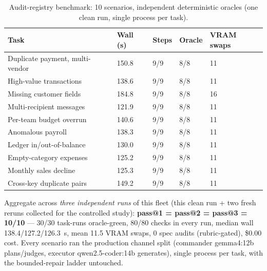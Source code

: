 \documentclass[11pt]{article}
\begin{document}
\begin{table}[h!t]\centering\small
\caption{Audit-registry benchmark: 10 scenarios, independent deterministic oracles
(one clean run, single process per task).
\label{tab:registry}}
\begin{tabular}{@{}lllll@{}}
\toprule
Task & Wall (s) & Steps & Oracle & VRAM swaps\\
\midrule
Duplicate payment, multi-vendor & 150.8 & 9/9 & 8/8 & 11\\
High-value transactions & 138.6 & 9/9 & 8/8 & 11\\
Missing customer fields & 184.8 & 9/9 & 8/8 & 16\\
Multi-recipient messages & 121.9 & 9/9 & 8/8 & 11\\
Per-team budget overrun & 140.6 & 9/9 & 8/8 & 11\\
Anomalous payroll & 138.3 & 9/9 & 8/8 & 11\\
Ledger in/out-of-balance & 130.0 & 9/9 & 8/8 & 11\\
Empty-category expenses & 125.2 & 9/9 & 8/8 & 11\\
Monthly sales decline & 125.3 & 9/9 & 8/8 & 11\\
Cross-key duplicate pairs & 149.2 & 9/9 & 8/8 & 11\\
\bottomrule
\end{tabular}
\end{table}

Aggregate across \emph{three independent runs} of this fleet (this clean run + two fresh
reruns collected for the controlled study): \textbf{pass@1 = pass@2 = pass@3 = 10/10} ---
30/30 task-runs oracle-green, 80/80 checks in every run, median wall 138.4/127.2/126.3~s,
mean 11.5 VRAM swaps, 0 spec audits (rubric-gated), \$0.00 cost. Every scenario ran the
production channel split (commander gemma4:12b plans/judges, executor qwen2.5-coder:14b
generates), single process per task, with the bounded-repair ladder untouched.
\end{document}
